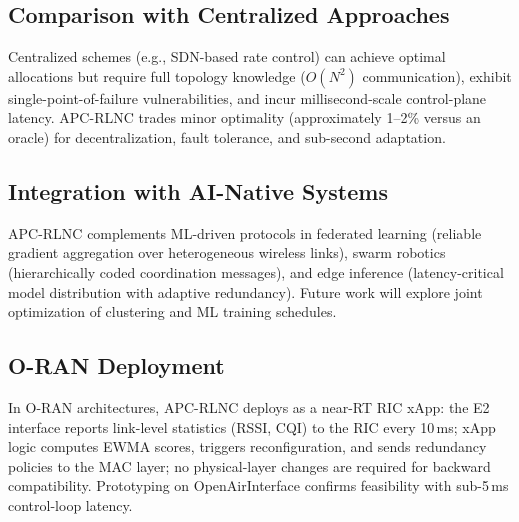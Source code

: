 \documentclass[journal]{IEEEtran}
\begin{document}
\subsection{Comparison with Centralized Approaches}
Centralized schemes (e.g., SDN-based rate control) can achieve optimal allocations but require full topology knowledge ($O(N^2)$ communication), exhibit single-point-of-failure vulnerabilities, and incur millisecond-scale control-plane latency. APC-RLNC trades minor optimality (approximately 1--2\% versus an oracle) for decentralization, fault tolerance, and sub-second adaptation.

\subsection{Integration with AI-Native Systems}
APC-RLNC complements ML-driven protocols in federated learning (reliable gradient aggregation over heterogeneous wireless links), swarm robotics (hierarchically coded coordination messages), and edge inference (latency-critical model distribution with adaptive redundancy). Future work will explore joint optimization of clustering and ML training schedules.

\subsection{O-RAN Deployment}
In O-RAN architectures, APC-RLNC deploys as a near-RT RIC xApp: the E2 interface reports link-level statistics (RSSI, CQI) to the RIC every 10\,ms; xApp logic computes EWMA scores, triggers reconfiguration, and sends redundancy policies to the MAC layer; no physical-layer changes are required for backward compatibility. Prototyping on OpenAirInterface confirms feasibility with sub-5\,ms control-loop latency.
\end{document}
